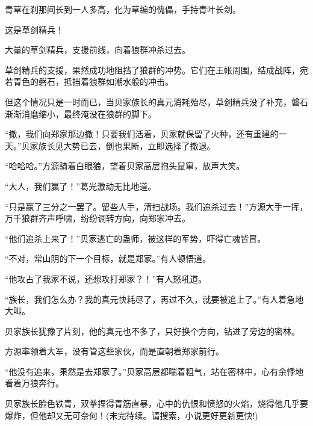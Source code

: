 \begin{this_body}
青草在刹那间长到一人多高，化为草编的傀儡，手持青叶长剑。

这是草剑精兵！

大量的草剑精兵，支援前线，向着狼群冲杀过去。

草剑精兵的支援，果然成功地阻挡了狼群的冲势。它们在王帐周围，结成战阵，宛若青色的磐石，抵挡着狼群如潮水般的冲击。

但这个情况只是一时而已，当贝家族长的真元消耗殆尽，草剑精兵没了补充，磐石渐渐消磨缩小，最终淹没在狼群的脚下。

“撤，我们向郑家那边撤！只要我们活着，贝家就保留了火种，还有重建的一天。”贝家族长见大势已去，倒也果断，立即选择了撤退。

“哈哈哈。”方源骑着白眼狼，望着贝家高层抱头鼠窜，放声大笑。

“大人，我们赢了！”葛光激动无比地道。

“只是赢了三分之一罢了。留些人手，清扫战场。我们追杀过去！”方源大手一挥，万千狼群齐声呼啸，纷纷调转方向，向郑家冲去。

“他们追杀上来了！”贝家逃亡的蛊师，被这样的军势，吓得亡魂皆冒。

“不对，常山阴的下一个目标，就是郑家。”有人顿悟道。

“他攻占了我家不说，还想攻打郑家？！”有人怒吼道。

“族长，我们怎么办？我的真元快耗尽了，再过不久，就要被追上了。”有人着急地大叫。

贝家族长犹豫了片刻，他的真元也不多了，只好换个方向，钻进了旁边的密林。

方源率领着大军，没有管这些家伙，而是直朝着郑家前行。

“他没有追来，果然是去郑家了。”贝家高层都喘着粗气，站在密林中，心有余悸地看着万狼奔行。

贝家族长脸色铁青，双拳捏得青筋直暴，心中的仇恨和愤怒的火焰，烧得他几乎要爆炸，但他却又无可奈何！(未完待续。请搜索，小说更好更新更快!)

\end{this_body}

